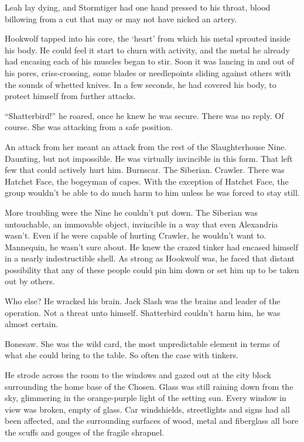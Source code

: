 Leah lay dying, and Stormtiger had one hand pressed to his throat, blood billowing from a cut that may or may not have nicked an artery.



Hookwolf tapped into his core, the `heart' from which his metal sprouted inside his body.  He could feel it start to churn with activity, and the metal he already had encasing each of his muscles began to stir.  Soon it was lancing in and out of his pores, criss-crossing, some blades or needlepoints sliding against others with the sounds of whetted knives.  In a few seconds, he had covered his body, to protect himself from further attacks.



``Shatterbird!'' he roared, once he knew he was secure.  There was no reply.  Of course.  She was attacking from a safe position.



An attack from her meant an attack from the rest of the Slaughterhouse Nine.  Daunting, but not impossible.  He was virtually invincible in this form.  That left few that could actively hurt him.  Burnscar.  The Siberian.  Crawler.  There was Hatchet Face, the bogeyman of capes.  With the exception of Hatchet Face, the group wouldn't be able to do much harm to him unless he was forced to stay still.



More troubling were the Nine he couldn't put down.  The Siberian was untouchable, an immovable object, invincible in a way that even Alexandria wasn't.  Even if he were capable of hurting Crawler, he wouldn't want to.  Mannequin, he wasn't sure about.  He knew the crazed tinker had encased himself in a nearly indestructible shell.  As strong as Hookwolf was, he faced that distant possibility that any of these people could pin him down or set him up to be taken out by others.



Who else?  He wracked his brain.  Jack Slash was the brains and leader of the operation.  Not a threat unto himself.  Shatterbird couldn't harm him, he was almost certain.



Bonesaw.  She was the wild card, the most unpredictable element in terms of what she could bring to the table.  So often the case with tinkers.



He strode across the room to the windows and gazed out at the city block surrounding the home base of the Chosen.  Glass was still raining down from the sky, glimmering in the orange-purple light of the setting sun.  Every window in view was broken, empty of glass.  Car windshields, streetlights and signs had all been affected, and the surrounding surfaces of wood, metal and fiberglass all bore the scuffs and gouges of the fragile shrapnel.



